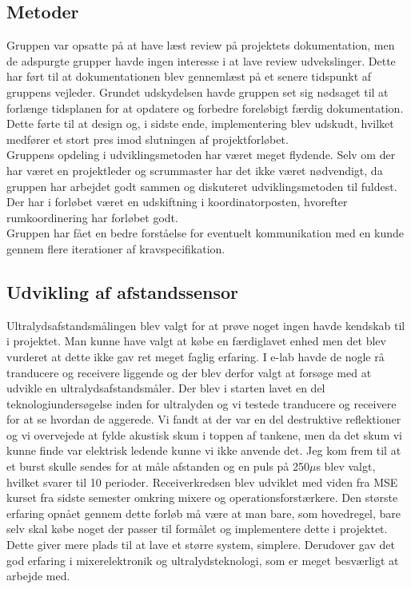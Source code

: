 \subsection{Metoder}
Gruppen var opsatte på at have læst review på projektets dokumentation, men de adspurgte grupper havde ingen interesse i at lave review udvekslinger. Dette har ført til at dokumentationen blev gennemlæst på et senere tidspunkt af gruppens vejleder. Grundet udskydelsen havde gruppen set sig nødsaget til at forlænge tidsplanen for at opdatere og forbedre foreløbigt færdig dokumentation. Dette førte til at design og, i sidste ende, implementering blev udskudt, hvilket medfører et stort pres imod slutningen af projektforløbet.\\
Gruppens opdeling i udviklingsmetoden har været meget flydende. Selv om der har været en projektleder og scrummaster har det ikke været nødvendigt, da gruppen har arbejdet godt sammen og diskuteret udviklingsmetoden til fuldest. Der har i forløbet været en udskiftning i koordinatorposten, hvorefter rumkoordinering har forløbet godt.\\
Gruppen har fået en bedre forståelse for eventuelt kommunikation med en kunde gennem flere iterationer af kravspecifikation.

\subsection{Udvikling af afstandssensor}
Ultralydsafstandsmålingen blev valgt for at prøve noget ingen havde kendskab til i projektet. Man kunne have valgt at købe en færdiglavet enhed men det blev vurderet at dette ikke gav ret meget faglig erfaring. I e-lab havde de nogle rå tranducere og receivere liggende og der blev derfor valgt at forsøge med at udvikle en ultralydsafstandsmåler. Der blev i starten lavet en del teknologiundersøgelse inden for ultralyden og vi testede tranducere og receivere for at se hvordan de aggerede. Vi fandt at der var en del destruktive reflektioner og vi overvejede at fylde akustisk skum i toppen af tankene, men da det skum vi kunne finde var elektrisk ledende kunne vi ikke anvende det. Jeg kom frem til at et burst skulle sendes for at måle afstanden og en puls på 250$\mu$s blev valgt, hvilket svarer til 10 perioder. Receiverkredsen blev udviklet med viden fra MSE kurset fra sidste semester omkring mixere og operationsforstærkere. Den største erfaring opnået gennem dette forløb må være at man bare, som hovedregel, bare selv skal købe noget der passer til formålet og implementere dette i projektet. Dette giver mere plads til at lave et større system, simplere. Derudover gav det god erfaring i mixerelektronik og ultralydsteknologi, som er meget besværligt at arbejde med.

